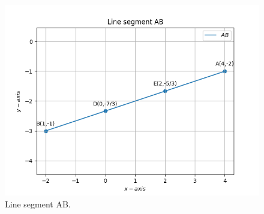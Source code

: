 \documentclass[12pt]{article}
\begin{document}
\begin{figure}[H]
			\centering
			\includegraphics[width=\columnwidth]{figs/Figure_1.png}
			\caption{Line segment AB.}
			\label{fig:14}
   \end{figure}
\end{document}

